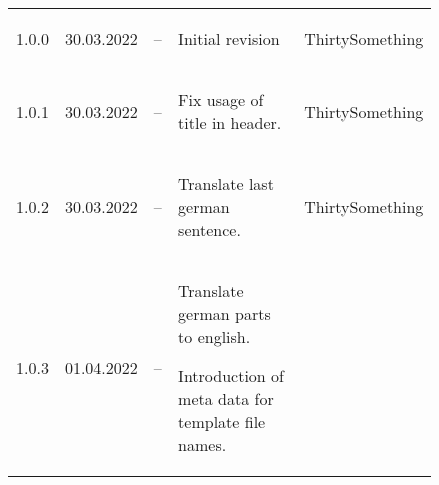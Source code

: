 \begin{tiny}
    \renewcommand*{\arraystretch}{1.5}
    \begin{longtable}{ | p{0.06\linewidth} | p{0.08\linewidth} | p{0.06\linewidth} | P{0.49\linewidth} | p{0.15\linewidth} | }
        \hline
             &
                &
             &
         &
                  \\
        \hline
        1.0.0                    &
        30.03.2022               &
        --                       &
        \begin{tsLTItemize}
            \item Initial revision
        \end{tsLTItemize}
                                 &
        ThirtySomething            \\
        \hline
        1.0.1                    &
        30.03.2022               &
        --                       &
        \begin{tsLTItemize}
            \item Fix usage of title in header.
        \end{tsLTItemize}
                                 &
        ThirtySomething            \\
        \hline
        1.0.2                    &
        30.03.2022               &
        --                       &
        \begin{tsLTItemize}
            \item Translate last german sentence.
        \end{tsLTItemize}
                                 &
        ThirtySomething            \\
        \hline
        1.0.3                    &
        01.04.2022               &
        --                       &
        \begin{tsLTItemize}
            \item Translate german parts to english.
            \item Introduction of meta data for template file names.
        \end{tsLTItemize}

\end{longtable}
\end{tiny}
